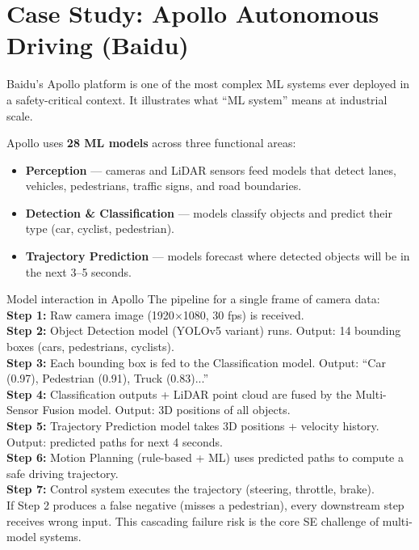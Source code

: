 \documentclass[a4paper,11pt]{article}
\begin{document}
\section{Case Study: Apollo Autonomous Driving (Baidu)}

Baidu's Apollo platform is one of the most complex ML systems ever deployed in a safety-critical context. It illustrates what ``ML system'' means at industrial scale.

Apollo uses \textbf{28 ML models} across three functional areas:
\begin{itemize}
  \item \textbf{Perception} --- cameras and LiDAR sensors feed models that detect lanes, vehicles, pedestrians, traffic signs, and road boundaries.
  \item \textbf{Detection \& Classification} --- models classify objects and predict their type (car, cyclist, pedestrian).
  \item \textbf{Trajectory Prediction} --- models forecast where detected objects will be in the next 3--5 seconds.
\end{itemize}

\begin{worked}{Model interaction in Apollo}
The pipeline for a single frame of camera data: \\
\textbf{Step 1:} Raw camera image (1920$\times$1080, 30 fps) is received. \\
\textbf{Step 2:} Object Detection model (YOLOv5 variant) runs. Output: 14 bounding boxes (cars, pedestrians, cyclists). \\
\textbf{Step 3:} Each bounding box is fed to the Classification model. Output: ``Car (0.97), Pedestrian (0.91), Truck (0.83)...'' \\
\textbf{Step 4:} Classification outputs + LiDAR point cloud are fused by the Multi-Sensor Fusion model. Output: 3D positions of all objects. \\
\textbf{Step 5:} Trajectory Prediction model takes 3D positions + velocity history. Output: predicted paths for next 4 seconds. \\
\textbf{Step 6:} Motion Planning (rule-based + ML) uses predicted paths to compute a safe driving trajectory. \\
\textbf{Step 7:} Control system executes the trajectory (steering, throttle, brake). \\[4pt]
If Step 2 produces a false negative (misses a pedestrian), every downstream step receives wrong input. This cascading failure risk is the core SE challenge of multi-model systems.
\end{worked}
\end{document}
